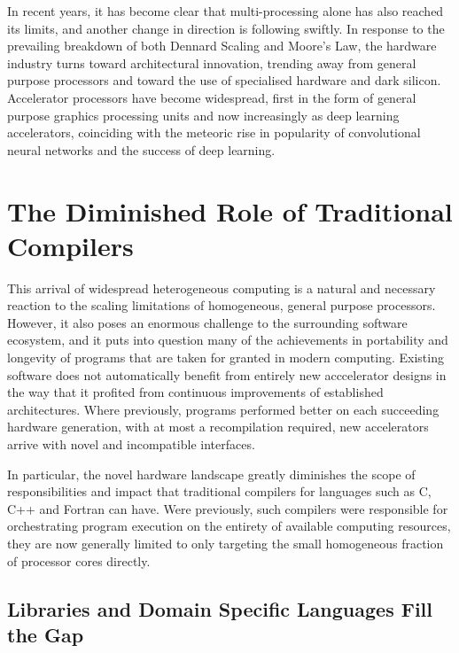     In recent years, it has become clear that multi-processing alone has
    also reached its limits, and another change in direction is following
    swiftly.
    In response to the prevailing breakdown of both Dennard Scaling and Moore's
    Law, the hardware industry turns toward architectural innovation, trending
    away from general purpose processors and toward the use of specialised
    hardware and dark silicon.
    Accelerator processors have become widespread, first in the form of general
    purpose graphics processing units and now increasingly as deep learning
    accelerators, coinciding with the meteoric rise in popularity of
    convolutional neural networks and the success of deep learning.

\section{The Diminished Role of Traditional Compilers}

    This arrival of widespread heterogeneous computing is a natural and
    necessary reaction to the scaling limitations of homogeneous, general
    purpose processors.
    However, it also poses an enormous challenge to the surrounding software
    ecosystem, and it puts into question many of the achievements in portability
    and longevity of programs that are taken for granted in modern computing.
    Existing software does not automatically benefit from entirely new
    acccelerator designs in the way that it profited from continuous
    improvements of established architectures.
    Where previously, programs performed better on each succeeding hardware
    generation, with at most a recompilation required, new accelerators arrive
    with novel and incompatible interfaces.

    In particular, the novel hardware landscape greatly diminishes the scope of
    responsibilities and impact that traditional compilers for languages such as
    C, C++ and Fortran can have.
    Were previously, such compilers were responsible for orchestrating
    program execution on the entirety of available computing resources, they are
    now generally limited to only targeting the small homogeneous fraction of
    processor cores directly.

\subsection{Libraries and Domain Specific Languages Fill the Gap}

